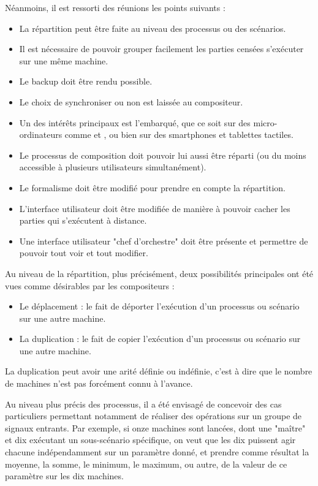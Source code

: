 Néanmoins, il est ressorti des réunions les points suivants : 
\begin{itemize}
	\item La répartition peut être faite au niveau des processus ou des scénarios.
	\item Il est nécessaire de pouvoir grouper facilement les parties censées s'exécuter sur une même machine.
	\item Le backup doit être rendu possible.
	\item Le choix de synchroniser ou non est laissée au compositeur.
	\item Un des intérêts principaux est l'embarqué, que ce soit sur des micro-ordinateurs comme  et , ou bien sur des smartphones et tablettes tactiles.
	\item Le processus de composition doit pouvoir lui aussi être réparti (ou du moins accessible à plusieurs utilisateurs simultanément).
	\item Le formalisme doit être modifié pour prendre en compte la répartition.
	\item L'interface utilisateur doit être modifiée de manière à pouvoir cacher les parties qui s'exécutent à distance.
	\item Une interface utilisateur "chef d'orchestre" doit être présente et permettre de pouvoir tout voir et tout modifier.
\end{itemize}

Au niveau de la répartition, plus précisément, deux possibilités principales ont été vues comme désirables par les compositeurs : 
\begin{itemize}
	\item Le déplacement : le fait de déporter l'exécution d'un processus ou scénario sur une autre machine.
	\item La duplication : le fait de copier l'exécution d'un processus ou scénario sur une autre machine.
\end{itemize}

La duplication peut avoir une arité définie ou indéfinie, c'est à dire que le nombre de machines n'est pas forcément connu à l'avance.

Au niveau plus précis des processus, il a été envisagé de concevoir des cas particuliers permettant notamment de réaliser des opérations sur un groupe de signaux entrants. Par exemple, si onze machines sont lancées, dont une "maître" et dix exécutant un sous-scénario spécifique, on veut que les dix puissent agir chacune indépendamment sur un paramètre donné, et prendre comme résultat la moyenne, la somme, le minimum, le maximum, ou autre, de la valeur de ce paramètre sur les dix machines.

